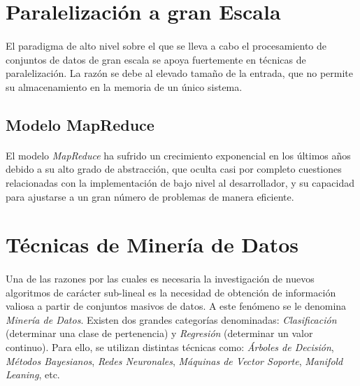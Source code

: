 \documentclass[a4paper]{article}
\begin{document}
  \section{Paralelización a gran Escala}

    \paragraph{}
    El paradigma de alto nivel sobre el que se lleva a cabo el procesamiento de conjuntos de datos de gran escala se apoya fuertemente en técnicas de paralelización. La razón se debe al elevado tamaño de la entrada, que no permite su almacenamiento en la memoria de un único sistema.

    \subsection{Modelo MapReduce}

      \paragraph{}
      El modelo \emph{MapReduce} ha sufrido un crecimiento exponencial en los últimos años debido a su alto grado de abstracción, que oculta casi por completo cuestiones relacionadas con la implementación de bajo nivel al desarrollador, y su capacidad para ajustarse a un gran número de problemas de manera eficiente.

  \section{Técnicas de Minería de Datos}

    \paragraph{}
    Una de las razones por las cuales es necesaria la investigación de nuevos algoritmos de carácter sub-lineal es la necesidad de obtención de información valiosa a partir de conjuntos masivos de datos. A este fenómeno se le denomina \emph{Minería de Datos}. Existen dos grandes categorías denominadas: \emph{Clasificación} (determinar una clase de pertenencia) y \emph{Regresión} (determinar un valor continuo). Para ello, se utilizan distintas técnicas como: \emph{Árboles de Decisión}, \emph{Métodos Bayesianos}, \emph{Redes Neuronales}, \emph{Máquinas de Vector Soporte}, \emph{Manifold Leaning}, etc.
\end{document}
